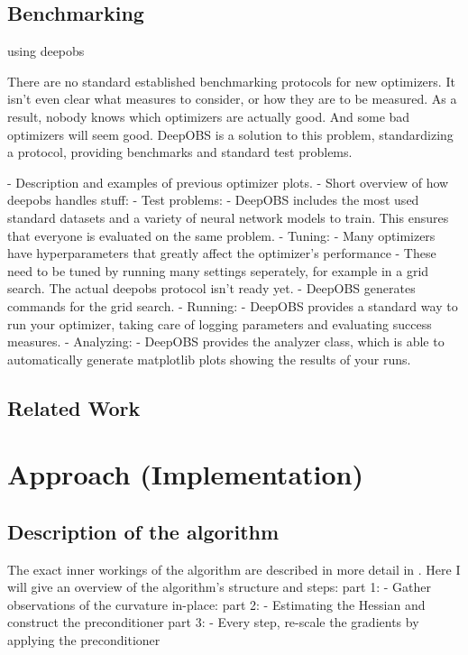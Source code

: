 \documentclass[twoside,12pt,a4paper]{report}
\begin{document}
\section{Benchmarking}
using deepobs \cite{deepobs}
\begin{markdown}
There are no standard established benchmarking protocols for new optimizers. It isn't even clear what measures to consider, or how they are to be measured. As a result, nobody knows which optimizers are actually good. And some bad optimizers will seem good.
DeepOBS is a solution to this problem, standardizing a protocol, providing benchmarks and standard test problems.

- Description and examples of previous optimizer plots.
- Short overview of how deepobs handles stuff:
    - Test problems:
      	- DeepOBS includes the most used standard datasets and a variety of neural network models to train. This ensures that everyone is evaluated on the same problem.
    - Tuning:
    	- Many optimizers have hyperparameters that greatly affect the optimizer's performance
 	    - These need to be tuned by running many settings seperately, for example in a grid search. The actual deepobs protocol isn't ready yet.
      - DeepOBS generates commands for the grid search.
    - Running:
      	- DeepOBS provides a standard way to run your optimizer, taking care of logging parameters and evaluating success measures.
    - Analyzing:
      	- DeepOBS provides the analyzer class, which is able to automatically generate matplotlib plots showing the results of your runs.
\end{markdown}

\section{Related Work}


\chapter{Approach (Implementation)}
\section{Description of the algorithm}
The exact inner workings of the algorithm are described in more detail in \cite{roos2019active}.
Here I will give an overview of the algorithm's structure and steps:
part 1: - Gather observations of the curvature in-place:
part 2: - Estimating the Hessian and construct the preconditioner
part 3: - Every step, re-scale the gradients by applying the preconditioner
\end{document}
